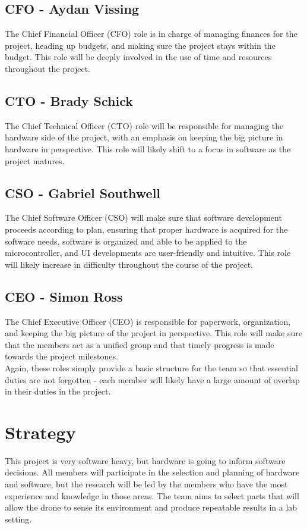 \documentclass[12pt, titlepage]{article}
\begin{document}
\subsection[Chief Financial Officer]{CFO - Aydan Vissing} The Chief Financial Officer (CFO) role is in charge of managing finances for the project, heading up budgets, and making sure the project stays within the budget. This role will be deeply involved in the use of time and resources throughout the project. \\

\subsection[Chief Technical Officer]{CTO - Brady Schick} The Chief Technical Officer (CTO) role will be responsible for managing the hardware side of the project, with an emphasis on keeping the big picture in hardware in perspective. This role will likely shift to a focus in software as the project matures. \\

\subsection[Chief Software Officer]{CSO - Gabriel Southwell} The Chief Software Officer (CSO) will make sure that software development proceeds according to plan, ensuring that proper hardware is acquired for the software needs, software is organized and able to be applied to the microcontroller, and UI developments are user-friendly and intuitive. This role will likely increase in difficulty throughout the course of the project. \\

\subsection[Chief Executive Officer]{CEO - Simon Ross} The Chief Executive Officer (CEO) is responsible for paperwork, organization, and keeping the big picture of the project in perspective. This role will make sure that the members act as a unified group and that timely progress is made towards the project milestones. \\

Again, these roles simply provide a basic structure for the team so that essential duties are not forgotten - each member will likely have a large amount of overlap in their duties in the project.

\section{Strategy}
This project is very software heavy, but hardware is going to inform software decisions. All members will participate in the selection and planning of hardware and software, but the research will be led by the members who have the most experience and knowledge in those areas. The team aims to select parts that will allow the drone to sense its environment and produce repeatable results in a lab setting.
\end{document}
